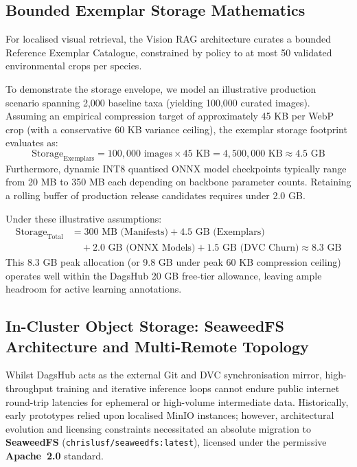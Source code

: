 \subsection{Bounded Exemplar Storage Mathematics}
For localised visual retrieval, the Vision RAG architecture curates a bounded Reference Exemplar Catalogue, constrained by policy to at most 50 validated environmental crops per species.

To demonstrate the storage envelope, we model an illustrative production scenario spanning 2,000 baseline taxa (yielding 100,000 curated images). Assuming an empirical compression target of approximately 45 KB per WebP crop (with a conservative 60 KB variance ceiling), the exemplar storage footprint evaluates as:
\[
\text{Storage}_{\text{Exemplars}} = 100{,}000 \text{ images} \times 45 \text{ KB} = 4{,}500{,}000 \text{ KB} \approx 4.5 \text{ GB}
\]
Furthermore, dynamic INT8 quantised ONNX model checkpoints typically range from 20 MB to 350 MB each depending on backbone parameter counts. Retaining a rolling buffer of production release candidates requires under 2.0 GB.

Under these illustrative assumptions:
\begin{align*}
\text{Storage}_{\text{Total}} &= 300 \text{ MB (Manifests)} + 4.5 \text{ GB (Exemplars)} \\
&\quad + 2.0 \text{ GB (ONNX Models)} + 1.5 \text{ GB (DVC Churn)} \approx 8.3 \text{ GB}
\end{align*}
This 8.3 GB peak allocation (or 9.8 GB under peak 60 KB compression ceiling) operates well within the DagsHub 20 GB free-tier allowance, leaving ample headroom for active learning annotations.

\subsection{In-Cluster Object Storage: SeaweedFS Architecture and Multi-Remote Topology}
\label{sec:seaweedfs_topology}

Whilst DagsHub acts as the external Git and DVC synchronisation mirror, high-throughput training and iterative inference loops cannot endure public internet round-trip latencies for ephemeral or high-volume intermediate data. Historically, early prototypes relied upon localised MinIO instances; however, architectural evolution and licensing constraints necessitated an absolute migration to \textbf{SeaweedFS} (\texttt{chrislusf/seaweedfs:latest}), licensed under the permissive \textbf{Apache~2.0} standard.

